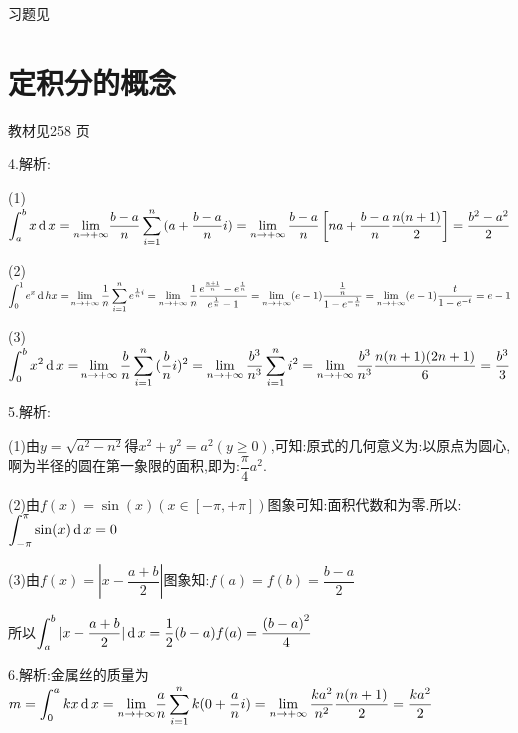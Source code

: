 \begin{flushright}
  \color{zhanqing!80}
   习题见
\end{flushright}


\section{定积分的概念}
\begin{flushright}
  \color{zhanqing!80}
   教材见258 页 %
\end{flushright}

4.解析:

(1)$\displaystyle\int_a^b {x\operatorname{\mathop{}\!\mathrm{d}} x = \lim\limits_{n \to +\infty} } \dfrac{{b - a}}{n}\sum\limits_{i = 1}^n {(a + \dfrac{{b - a}}{n}i)}  = \lim\limits_{n \to +\infty} \dfrac{{b - a}}{n}\left[ {na + \frac{{b - a}}{n}\dfrac{{n(n + 1)}}{2}} \right] = \dfrac{{{b^2} - {a^2}}}{2}$

(2)$\displaystyle\int_0^1 {{e^x}\operatorname{\mathop{}\!\mathrm{d}} hx = } \lim\limits_{n \to +\infty} \dfrac{1}{n}\sum\limits_{i = 1}^n {{e^{\frac{1}{n}i}}}  = \lim\limits_{n \to +\infty} \dfrac{1}{n}\dfrac{{{e^{\frac{{n + 1}}{n}}} - {e^{\frac{1}{n}}}}}{{{e^{\frac{1}{n}}} - 1}} = \lim\limits_{n \to +\infty} (e - 1)\dfrac{{\frac{1}{n}}}{{1 - {e^{ - \frac{1}{n}}}}} = \lim\limits_{n \to +\infty} (e - 1)\dfrac{t}{{1 - {e^{ - t}}}} = e - 1$

(3)$\displaystyle\int_0^b {{x^2}\operatorname{\mathop{}\!\mathrm{d}} x = } \lim\limits_{n \to +\infty} \dfrac{b}{n}\sum\limits_{i = 1}^n {(\dfrac{b}{n}} i{)^2} = \lim\limits_{n \to +\infty} \dfrac{{{b^3}}}{{{n^3}}}\sum\limits_{i = 1}^n {{i^2}}  = \lim\limits_{n \to +\infty} \frac{{{b^3}}}{{{n^3}}}\dfrac{{n(n + 1)(2n + 1)}}{6} = \frac{{{b^3}}}{3}$

5.解析:

(1)由$y = \sqrt {{a^2} - {n^2}} $得${x^2} + {y^2} = {a^2}(y \geqslant 0)$,可知:原式的几何意义为:以原点为圆心,啊为半径的圆在第一象限的面积,即为:$\dfrac{\pi }{4}{a^2}$.

(2)由$f(x) = \sin (x)(x \in \left[ { - \pi , + \pi } \right])$图象可知:面积代数和为零.所以:$\displaystyle\int_{ - \pi }^\pi  {\sin (x)\operatorname{\mathop{}\!\mathrm{d}}x = 0} $

(3)由$f(x) = |x - \dfrac{{a + b}}{2}|$图象知:$f(a) = f(b) = \dfrac{{b - a}}{2}$

所以$\displaystyle\int_a^b {|x - \frac{{a + b}}{2}|} \operatorname{\mathop{}\!\mathrm{d}} x = \frac{1}{2}(b - a)f(a) = \dfrac{{{{(b - a)}^2}}}{4}$

6.解析:金属丝的质量为$m = \displaystyle\int_0^a {kx\operatorname{\mathop{}\!\mathrm{d}} x = \lim\limits_{n \to +\infty} } \frac{a}{n}\sum\limits_{i = 1}^n {k(0 + \frac{a}{n}} i) = \lim\limits_{n \to +\infty} \frac{{k{a^2}}}{{{n^2}}}\frac{{n(n + 1)}}{2} = \frac{{k{a^2}}}{2}$

